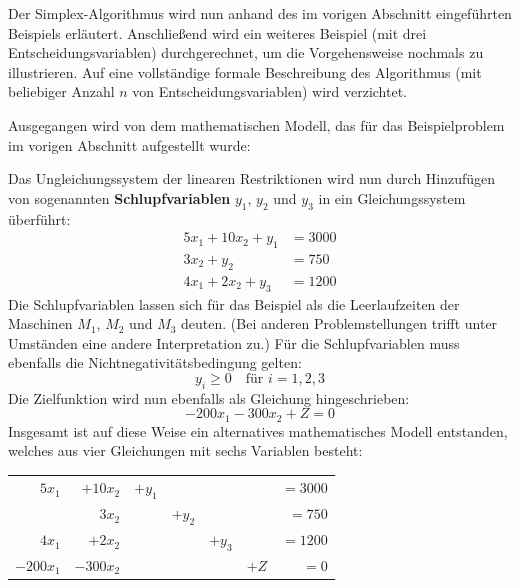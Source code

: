 Der Simplex-Algorithmus wird nun anhand des im vorigen Abschnitt eingeführten Beispiels erläutert. Anschließend wird ein weiteres Beispiel (mit drei Entscheidungsvariablen) durchgerechnet, um die Vorgehensweise nochmals zu illustrieren. Auf eine vollständige formale Beschreibung des Algorithmus (mit beliebiger Anzahl $n$ von Entscheidungsvariablen) wird verzichtet.

Ausgegangen wird von dem mathematischen Modell, das für das Beispielproblem im vorigen Abschnitt aufgestellt wurde:
\begin{center}
\end{center}

Das Ungleichungssystem der linearen Restriktionen wird nun durch Hinzufügen von sogenannten \textbf{Schlupfvariablen} $y_1$, $y_2$ und $y_3$ in ein Gleichungssystem überführt:
\begin{align*}
  5x_1 + 10x_2 + y_1 &= 3000\\
  3x_2 + y_2 &= 750\\
  4x_1 + 2x_2 + y_3 &= 1200
\end{align*}
Die Schlupfvariablen lassen sich für das Beispiel als die Leerlaufzeiten der Maschinen $M_1$, $M_2$ und $M_3$ deuten. (Bei anderen Problemstellungen trifft unter Umständen eine andere Interpretation zu.) Für die Schlupfvariablen muss ebenfalls die Nichtnegativitätsbedingung gelten:
\[ y_i \geq 0 \quad \text{für } i = 1,2,3 \]
Die Zielfunktion wird nun ebenfalls als Gleichung hingeschrieben:
\[ -200 x_1 - 300 x_2 + Z = 0 \]
Insgesamt ist auf diese Weise ein alternatives mathematisches Modell entstanden, welches aus vier Gleichungen mit sechs Variablen besteht:

\begin{center}
  \begin{tabular}{|rr|rrr|r|r|}
    \hline
    $5x_1$ & $+10x_2$ & $+y_1$ & & & & $= 3000$\\
    & $3x_2$ & & $+y_2$ & & & $= 750$\\
    $4x_1$ & $+2x_2$ & & & $+y_3$ & & $= 1200$\\
    $-200x_1$ & $-300x_2$ & & & & $+Z$ & $= 0$\\
    \hline
  \end{tabular}
\end{center}

